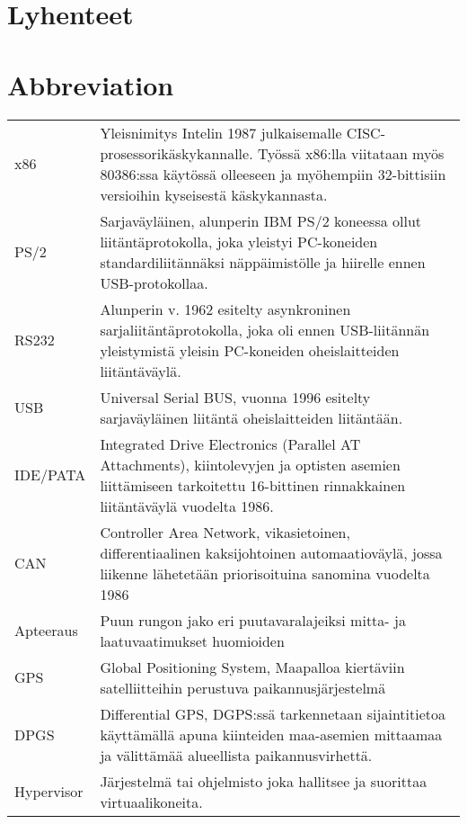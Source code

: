 \documentclass[11pt,a4paper,oneside,article]{memoir}
\begin{document}
\pagestyle{empty}
\setlength{\parskip}{1cm}
 {
  \chapter*{Lyhenteet}
} {
  \chapter*{Abbreviation}
}
\begin{table}[h]
\setlength{\tabcolsep}{8pt}
\renewcommand{\arraystretch}{2}
\begin{tabular}{l p{12cm}}
x86 & Yleisnimitys Intelin 1987 julkaisemalle CISC-prosessorikäskykannalle. Työssä x86:lla viitataan myös 80386:ssa käytössä olleeseen ja myöhempiin 32-bittisiin versioihin kyseisestä käskykannasta.\\
PS/2 & Sarjaväyläinen, alunperin IBM PS/2 koneessa ollut liitäntäprotokolla, joka yleistyi PC-koneiden standardiliitännäksi näppäimistölle ja hiirelle ennen USB-protokollaa.\\
RS232 & Alunperin v. 1962 esitelty asynkroninen sarjaliitäntäprotokolla, joka oli ennen USB-liitännän yleistymistä yleisin PC-koneiden oheislaitteiden liitäntäväylä.\\
USB & Universal Serial BUS, vuonna 1996 esitelty sarjaväyläinen liitäntä oheislaitteiden liitäntään.\\
IDE/PATA & Integrated Drive Electronics (Parallel AT Attachments), kiintolevyjen ja optisten asemien liittämiseen tarkoitettu 16-bittinen rinnakkainen liitäntäväylä vuodelta 1986.\\
CAN & Controller Area Network, vikasietoinen, differentiaalinen kaksijohtoinen automaatioväylä, jossa liikenne lähetetään priorisoituina sanomina vuodelta 1986\\
Apteeraus & Puun rungon jako eri puutavaralajeiksi mitta- ja laatuvaatimukset huomioiden\\
GPS & Global Positioning System, Maapalloa kiertäviin satelliitteihin perustuva paikannusjärjestelmä\\
DPGS & Differential GPS, DGPS:ssä tarkennetaan sijaintitietoa käyttämällä apuna kiinteiden maa-asemien mittaamaa ja välittämää alueellista paikannusvirhettä.\\
Hypervisor & Järjestelmä tai ohjelmisto joka hallitsee ja suorittaa virtuaalikoneita.\\
%
\end{tabular}
\end{table}
\end{document}
